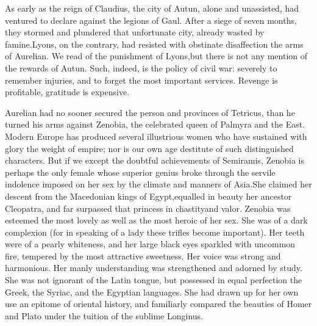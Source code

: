 

As early as the reign of Claudius, the city
of Autun, alone and unassisted, had ventured to declare against
the legions of Gaul. After a siege of seven months, they stormed
and plundered that unfortunate city, already wasted by famine.\footnotemark[52]
Lyons, on the contrary, had resisted with obstinate disaffection
the arms of Aurelian. We read of the punishment of Lyons,\footnotemark[53] but
there is not any mention of the rewards of Autun. Such, indeed,
is the policy of civil war: severely to remember injuries, and to
forget the most important services. Revenge is profitable,
gratitude is expensive.



Aurelian had no sooner secured the person and provinces of
Tetricus, than he turned his arms against Zenobia, the celebrated
queen of Palmyra and the East. Modern Europe has produced several
illustrious women who have sustained with glory the weight of
empire; nor is our own age destitute of such distinguished
characters. But if we except the doubtful achievements of
Semiramis, Zenobia is perhaps the only female whose superior
genius broke through the servile indolence imposed on her sex by
the climate and manners of Asia.\footnotemark[54] She claimed her descent from
the Macedonian kings of Egypt,\footnotemark[541] equalled in beauty her
ancestor Cleopatra, and far surpassed that princess in chastity\footnotemark[55]
and valor. Zenobia was esteemed the most lovely as well as the
most heroic of her sex. She was of a dark complexion (for in
speaking of a lady these trifles become important). Her teeth
were of a pearly whiteness, and her large black eyes sparkled
with uncommon fire, tempered by the most attractive sweetness.
Her voice was strong and harmonious. Her manly understanding was
strengthened and adorned by study. She was not ignorant of the
Latin tongue, but possessed in equal perfection the Greek, the
Syriac, and the Egyptian languages. She had drawn up for her own
use an epitome of oriental history, and familiarly compared the
beauties of Homer and Plato under the tuition of the sublime
Longinus.


